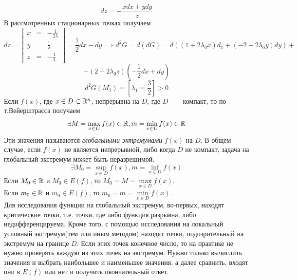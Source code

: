 \documentclass[../../main.tex]{subfiles}
\begin{document}
	\[ dz = - \frac{xdx + ydy}{z}\]
	В рассмотренных стационарных точках получаем
	\[ dz = \left[
	\begin{array}{ccc}
	x & = & -\frac{1}{2\lambda} \\
	y & = & \frac{1}{\lambda} \\
	z & = & -\frac{1}{\lambda}
	\end{array}
	\right] = \frac{1}{2}dx - dy \implies d^2G = d\left(dG\right) = 
	d\left(\left(1 + 2\lambda_0x\right)d_x + \left(-2 
	+ 2\lambda_0y\right)dy\right) +\] 
	\[ + \left(2 - 2\lambda_0z\right)\left(-\frac{1}{2}dx + dy\right) \] 
	\[d^2G(M_1) = \left[\lambda_1 = \frac{3}{2}\right] > 0\]
	Если $f\left(x\right)$, где $x \in D \subset \mathbb{R}^n$, непрерывна на $D$,
	где $D$ ~--- компакт, то по т.Вейерштрасса получаем
	\[ \exists M = \max\limits_{x \in D} f(x) \in \mathbb{R},
	m = \min\limits_{x \in D} f(x) \in \mathbb{R} \]
	Эти значения называются \emph{глобальными эктремумами} $f(x)$ на $D$.
	В общем случае, если $f(x)$ не является непрерывной, либо когда $D$ 
	не компакт, задача на глобальный экстремум может быть неразрешимой.
	\[ \exists M_0 = \sup\limits_{x \in D} f(x),
	m = \inf\limits_{x \in D} f(x) \]
	Если $M_0 \in \mathbb{R}$ и $M_0 \in E(f)$, то $M_0 = M = 
	\max\limits_{x \in D} f(x)$. \\
	Если $m_0 \in \mathbb{R}$ и $m_0 \in E(f)$, то $m_0 = m = 
	\min\limits_{x \in D} f(x)$. \\
	Для исследования функции на глобальный экстремум, во-первых, 
	находят критические точки, т.е. точки, 
	где либо функция разрывна, либо недифференцируема. Кроме того, с помощью 
	исследования на локальный условный экстремум(тем или иным методом)
	находят точки, подозрительный на экстремум на границе $D$.
	Если этих точек конечное число, то на практике не нужно проверять каждую из 
	этих точек на экстремум.
	Нужно только вычислить значения и выбрать наибольшее и наименьшее значения, 
	а далее сравнить, входят они в $E(f)$ или нет и 
	получить окончательный ответ.\\
	
\end{document}
